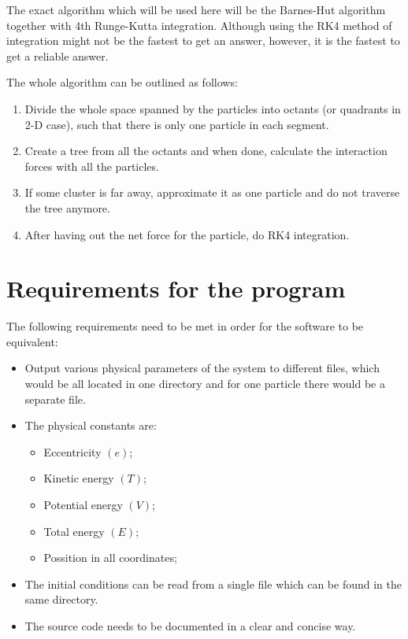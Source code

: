 \documentclass[
    draft,
    fontsize=11pt,
    DIV=calc
]{scrartcl}
\begin{document}
The exact algorithm which will be used here will be the Barnes-Hut algorithm together with 4th Runge-Kutta integration.
%
Although using the RK4 method of integration might not be the fastest to get an answer, however, it is the fastest to get a reliable answer.

%
The whole algorithm can be outlined as follows:
%
\begin{enumerate}
    \item Divide the whole space spanned by the particles into octants (or quadrants in 2-D case), such that there is only one particle in each segment.
    \item Create a tree from all the octants and when done, calculate the interaction forces with all the particles.
    \item If some cluster is far away, approximate it as one particle and do not traverse the tree anymore.
    \item After having out the net force for the particle, do RK4 integration.
\end{enumerate}

\section{Requirements for the program}

The following requirements need to be met in order for the software to be equivalent:
%
\begin{itemize}
    \item Output various physical parameters of the system to different files, which would be all located in one directory and for one particle there would be a separate file.
    \item The physical constants are:
        \begin{itemize}
            \item Eccentricity $\left( e \right)$;
            \item Kinetic energy $\left( T \right)$;
            \item Potential energy $\left( V \right)$;
            \item Total energy $\left( E \right)$;
            \item Possition in all coordinates;
        \end{itemize}
    \item The initial conditions can be read from a single file which can be found in the same directory.
    \item The source code needs to be documented in a clear and concise way.
\end{itemize}
\end{document}
